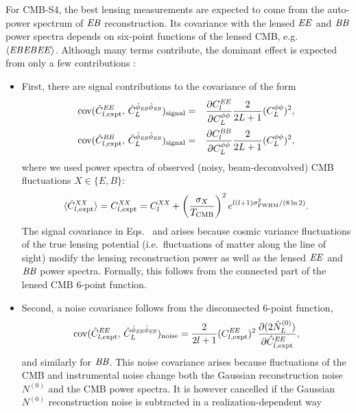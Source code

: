 \documentclass[prd,superscriptaddress,nofootinbib,floatfix,notitlepage]{revtex4-1}
\begin{document}
For CMB-S4, the best lensing measurements are expected to come from the auto-power spectrum of $\mathit{EB}$ reconstruction.  Its covariance with the lensed $\mathit{EE}$ and $\mathit{BB}$ power spectra depends on six-point functions of the lensed CMB, e.g.~$\langle \mathit{EB}\mathit{EB}\mathit{EE} \rangle$. Although many terms contribute, the dominant effect is expected from only a few contributions \cite{marcel1308}:  

\begin{itemize}
\item First, there are signal contributions to the covariance of the form
\begin{eqnarray}
  \label{eq:covEEphiEBphiEB}
  \text{cov}(\hat C^{\mathit{EE}}_{l,\text{expt}},\, \hat
  C^{\hat\phi_{\mathit{EB}}\hat\phi_{\mathit{EB}}}_{L})_\mathrm{signal}
&=&
\frac{\partial C^{\mathit{EE}}_l}{\partial C^{\phi\phi}_{L}}
\frac{2}{2L+1} (C^{\phi\phi}_{L})^2,\\
  \label{eq:covBBphiEBphiEB}
  \text{cov}(\hat C^{\mathit{BB}}_{l,\text{expt}},\, \hat
  C^{\hat\phi_{\mathit{EB}}\hat\phi_{\mathit{EB}}}_{L})_\mathrm{signal}
&=&
\frac{\partial C^{\mathit{BB}}_l}{\partial C^{\phi\phi}_{L}}
\frac{2}{2L+1} (C^{\phi\phi}_{L})^2,
\end{eqnarray}
where we used power spectra of observed (noisy, beam-deconvolved) CMB fluctuations $X\in \{E,B\}$:
\begin{equation}
  \label{eq:CXXexptExpectation}
  \langle\hat C^{\mathit{XX}}_{l,\text{expt}}\rangle = 
 C^{\mathit{XX}}_{l,\text{expt}} = C^{\mathit{XX}}_{l}
+ \left(\frac{\sigma_X}{T_\mathrm{CMB}}\right)^2 
  e^{l(l+1)\sigma^2_{\mathrm{FWHM}}/(8\ln 2)}.
\end{equation}
The signal covariance in Eqs.~ and  arises because cosmic variance fluctuations of the true lensing potential (i.e.~fluctuations of matter along the line of sight) modify the lensing reconstruction power as well as the lensed $\mathit{EE}$ and $\mathit{BB}$ power spectra.  Formally, this follows from the connected part of the lensed CMB 6-point function.
\item Second, a noise covariance follows from the disconnected 6-point function,
\begin{align}
  \label{eq:2}
\mathrm{cov}(\hat C^{\mathit{EE}}_{l,\mathrm{expt}}, \,\hat C^{\hat\phi_{\mathit{EB}}\hat\phi_{\mathit{EB}}}_L)_\mathrm{noise}
=
\frac{2}{2l+1}(C^{\mathit{EE}}_{l,\mathrm{expt}})^2 \, \frac{\partial(2\hat N^{(0)}_L)}{\partial \hat C^{\mathit{EE}}_{l,\mathrm{expt}}},
\end{align}
and similarly for $\mathit{BB}$.
This noise covariance arises because fluctuations of the CMB and instrumental noise change both the Gaussian reconstruction noise $N^{(0)}$ and the CMB power spectra.  It is however cancelled if the Gaussian $N^{(0)}$ reconstruction noise is subtracted in a realization-dependent way \cite{cora0812,duncan1008,Namikawa1209,marcel1308}

\end{itemize}
\end{document}
